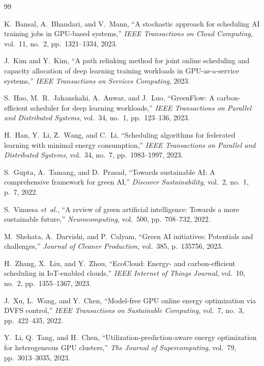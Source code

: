\documentclass[12pt]{report}
\begin{document}
\clearpage{}
{}
\begin{singlespace}
\begin{thebibliography}{99}

K.~Bansal, A.~Bhandari, and V.~Mann, ``A stochastic approach for scheduling AI training jobs in GPU-based systems,'' \emph{IEEE Transactions on Cloud Computing}, vol.~11, no.~2, pp.~1321--1334, 2023.

J.~Kim and Y.~Kim, ``A path relinking method for joint online scheduling and capacity allocation of deep learning training workloads in GPU-as-a-service systems,'' \emph{IEEE Transactions on Services Computing}, 2023.

S.~Hao, M.~R.~Jahanshahi, A.~Anwar, and J.~Luo, ``GreenFlow: A carbon-efficient scheduler for deep learning workloads,'' \emph{IEEE Transactions on Parallel and Distributed Systems}, vol.~34, no.~1, pp.~123--136, 2023.

H.~Han, Y.~Li, Z.~Wang, and C.~Li, ``Scheduling algorithms for federated learning with minimal energy consumption,'' \emph{IEEE Transactions on Parallel and Distributed Systems}, vol.~34, no.~7, pp.~1983--1997, 2023.

S.~Gupta, A.~Tamang, and D.~Prasad, ``Towards sustainable AI: A comprehensive framework for green AI,'' \emph{Discover Sustainability}, vol.~2, no.~1, p.~7, 2022.

S.~Vinuesa \emph{et~al.}, ``A review of green artificial intelligence: Towards a more sustainable future,'' \emph{Neurocomputing}, vol.~500, pp.~708--732, 2022.

M.~Shehata, A.~Darvishi, and P.~Calyam, ``Green AI initiatives: Potentials and challenges,'' \emph{Journal of Cleaner Production}, vol.~385, p.~135756, 2023.

H.~Zhang, X.~Liu, and Y.~Zhou, ``EcoCloud: Energy- and carbon-efficient scheduling in IoT-enabled clouds,'' \emph{IEEE Internet of Things Journal}, vol.~10, no.~2, pp.~1355--1367, 2023.

J.~Xu, L.~Wang, and Y.~Chen, ``Model-free GPU online energy optimization via DVFS control,'' \emph{IEEE Transactions on Sustainable Computing}, vol.~7, no.~3, pp.~422--435, 2022.

Y.~Li, Q.~Tang, and H.~Chen, ``Utilization-prediction-aware energy optimization for heterogeneous GPU clusters,'' \emph{The Journal of Supercomputing}, vol.~79, pp.~3013--3035, 2023.


\end{thebibliography}
\end{singlespace}
\end{document}
